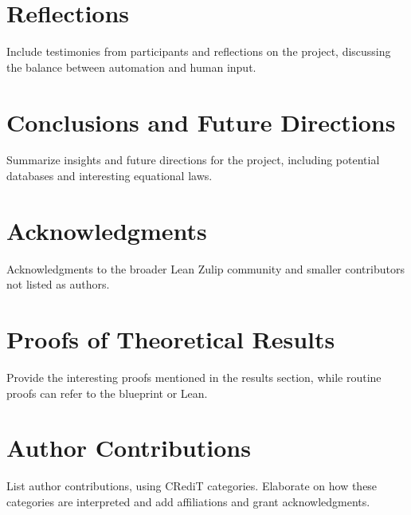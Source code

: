 \documentclass[12pt]{article}
\theoremstyle{definition}
\begin{document}
\section{Reflections}
Include testimonies from participants and reflections on the project, discussing the balance between automation and human input.

\section{Conclusions and Future Directions}
Summarize insights and future directions for the project, including potential databases and interesting equational laws.

\section*{Acknowledgments}
Acknowledgments to the broader Lean Zulip community and smaller contributors not listed as authors.

\appendix
\section{Proofs of Theoretical Results}
Provide the interesting proofs mentioned in the results section, while routine proofs can refer to the blueprint or Lean.

\section{Author Contributions}
List author contributions, using CRediT categories. Elaborate on how these categories are interpreted and add affiliations and grant acknowledgments.



\end{document}
